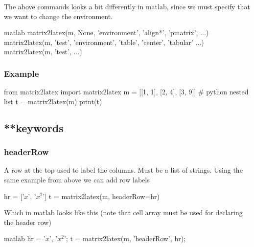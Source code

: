 The above commands looks a bit differently in matlab, since we must specify
that we want to change the environment.
\begin{pygments}{matlab}
matrix2latex(m, None, 'environment', {'align*', 'pmatrix'}, ...)
matrix2latex(m, 'test', 'environment', {'table', 'center', 'tabular'} ...)
matrix2latex(m, 'test', ...)
\end{pygments}

\subsubsection{Example}
\begin{pyblock}
from matrix2latex import matrix2latex
m = [[1, 1], [2, 4], [3, 9]] # python nested list
t = matrix2latex(m)
print(t)
\end{pyblock}

\subsection{**keywords}
\subsubsection{headerRow}
A row at the top used to label the columns.
Must be a list of strings.
Using the same example from above we can add row labels
\begin{pyblock}
hr = ['$x$', '$x^2$']
t = matrix2latex(m, headerRow=hr)
\end{pyblock}

Which in matlab looks like this (note that cell array must be used for
declaring the header row)
\begin{pygments}{matlab}
hr = {'$x$', '$x^2$'};
t = matrix2latex(m, 'headerRow', hr);
\end{pygments}

